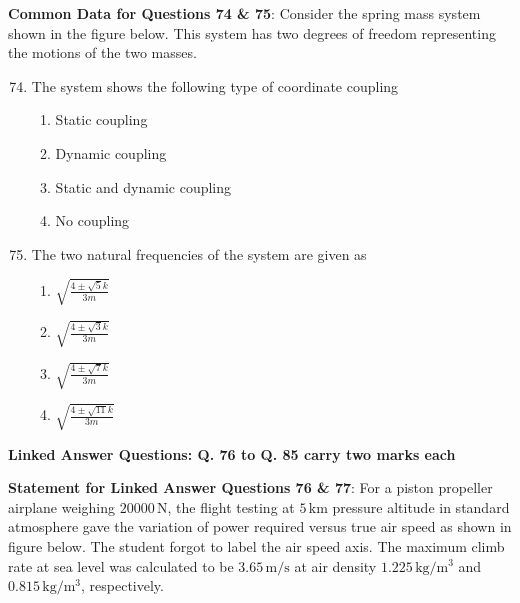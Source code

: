 \documentclass{article}
\begin{document}
\textbf{Common Data for Questions 74 \& 75}: Consider the spring mass system shown in the figure below. This system has two degrees of freedom representing the motions of the two masses.

\begin{figure}[H]
    \centering
    
    \caption{}
    \label{fig:q74 75}
\end{figure}

\begin{enumerate}
    \setcounter{enumi}{73}
    \item The system shows the following type of coordinate coupling
    \begin{enumerate}
        \item Static coupling
        \item Dynamic coupling
        \item Static and dynamic coupling
        \item No coupling
    \end{enumerate}

    \item The two natural frequencies of the system are given as
    \begin{multicols}{2}
    \begin{enumerate}
        \item $\sqrt{\frac{4 \pm \sqrt{5} k}{3 m}}$
        \item $\sqrt{\frac{4 \pm \sqrt{3} k}{3 m}}$
        \item $\sqrt{\frac{4 \pm \sqrt{7} k}{3 m}}$
        \item $\sqrt{\frac{4 \pm \sqrt{11} k}{3 m}}$
    \end{enumerate}
    \end{multicols}
    
\end{enumerate}

\begin{center}
    \textbf{Linked Answer Questions: Q. 76 to Q. 85 carry two marks each}
\end{center}


\textbf{Statement for Linked Answer Questions 76 \& 77}: For a piston propeller airplane weighing $20000 \, \mathrm{N}$, the flight testing at $5 \, \mathrm{km}$ pressure altitude in standard atmosphere gave the variation of power required versus true air speed as shown in figure below. The student forgot to label the air speed axis. The maximum climb rate at sea level was calculated to be $3.65 \, \mathrm{m/s}$ at air density $1.225 \, \mathrm{kg/m^3}$ and $0.815 \, \mathrm{kg/m^3}$, respectively.
\end{document}
